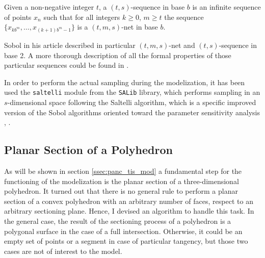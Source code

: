 Given a non-negative integer $t$, a $(t,s)$-sequence in base $b$ is an infinite sequence of points $x_n$ such that for all integers $k \geq 0$, $m \geq t$ the sequence $ \{ x_{kb^m}, \dots, x_{(k+1)b^m-1} \}$ is a $(t,m,s)$-net in base $b$.

Sobol in his article described in particular $(t,m,s)$-net and $(t,s)$-sequence in base 2. A more thorough description of all the formal properties of those particular sequences could be found in \cite{SOBOL1976236}.

In order to perform the actual sampling during the modelization, it has been used the \texttt{saltelli} module from the \texttt{SALib} library, which performs sampling in an $s$-dimensional space following the Saltelli algorithm, which is a specific improved version of the Sobol algorithms oriented toward the parameter sensitivity analysis \cite{SALTELLI2002280}, \cite{SALTELLI2010259}.

\subsection{Planar Section of a Polyhedron} \label{ssec:pol_sec}
As will be shown in section \ref{ssec:panc_tis_mod} a fundamental step for the functioning of the modelization is the planar section of a three-dimensional polyhedron. It turned out that there is no general rule to perform a planar section of a convex polyhedron with an arbitrary number of faces, respect to an arbitrary sectioning plane. Hence, I devised an algorithm to handle this task. In the general case, the result of the sectioning process of a polyhedron is a polygonal surface in the case of a full intersection. Otherwise, it could be an empty set of points or a segment in case of particular tangency, but those two cases are not of interest to the model.

